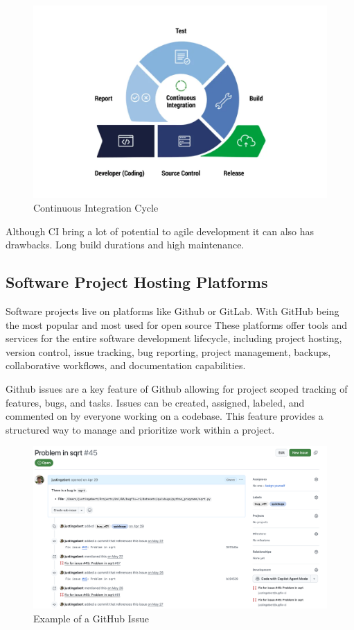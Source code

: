 \begin{figure}[H]
    \centering
    \includegraphics[width=1\textwidth]{images/ci-cycle.png}
    \caption{Continuous Integration Cycle}
    \label{fig:ci-cycle}
\end{figure}

Although CI bring a lot of potential to agile development it can also has drawbacks. Long build durations and high maintenance. %

\subsection{Software Project Hosting Platforms} \label{subsection:Software Project Hosting Platforms}
Software projects live on platforms like Github or GitLab. With GitHub being the most popular and most used for open source %
These platforms offer tools and services for the entire software development lifecycle, including project hosting, version control, issue tracking, bug reporting, project management, backups, collaborative workflows, and documentation capabilities. \cite{abrahamssonAgileSoftwareDevelopment2017}

Github issues are a key feature of Github allowing for project scoped tracking of features, bugs, and tasks. Issues can be created, assigned, labeled, and commented on by everyone working on a codebase. This feature provides a structured way to manage and prioritize work within a project.

\begin{figure}[H]
    \centering
    \includegraphics[width=1\textwidth]{images/github/GitHub Issue.png}
    \caption{Example of a GitHub Issue}
    \label{fig:gh-issue}
\end{figure}

